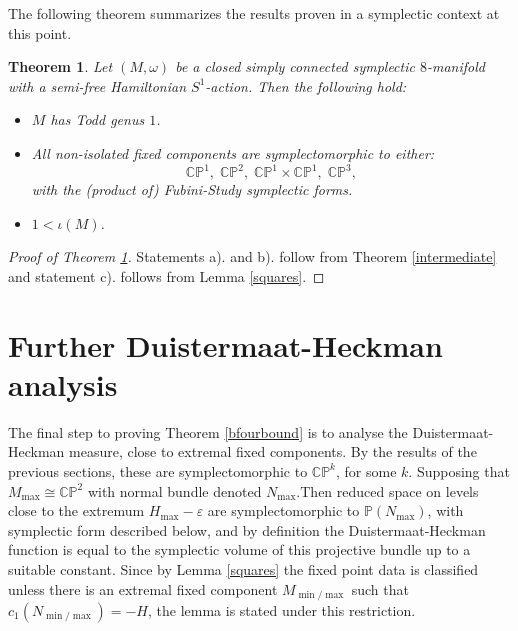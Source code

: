 \documentclass[12pt]{article}
\newtheorem{theorem}{Theorem}[section]
\begin{document}
The following theorem summarizes the results proven in a symplectic context at this point.

\begin{theorem} \label{symplecticmain}
Let $(M,\omega)$ be a closed  simply connected symplectic $8$-manifold with a semi-free Hamiltonian $S^1$-action. Then the following hold:
\begin{itemize}

\item[a).] $M$  has Todd genus $1$.
\item[b).] All non-isolated fixed  components are symplectomorphic to either: $$ \mathbb{CP}^1,\;\mathbb{CP}^2, \; \mathbb{CP}^1 \times \mathbb{CP}^1,\; \mathbb{CP}^3,$$ with the (product of) Fubini-Study symplectic forms.

\item[c).] $1 < \iota(M)$.
\end{itemize}
\end{theorem}
\begin{proof}[Proof of Theorem \ref{symplecticmain}]
Statements a). and  b). follow from Theorem \ref{intermediate} and statement c). follows from Lemma \ref{squares}. \end{proof}



\section{Further Duistermaat-Heckman analysis} \label{DHA}
The final step to proving Theorem \ref{bfourbound} is to analyse the Duistermaat-Heckman measure, close to extremal fixed components. By the results of the previous sections, these are symplectomorphic to $\mathbb{CP}^k$, for some $k$.  Supposing that $M_{\max} \cong \mathbb{CP}^2$ with normal bundle denoted $N_{\max}$.Then reduced space on levels close to the extremum $H_{\max} - \varepsilon$ are symplectomorphic to $\mathbb{P}(N_{\max})$, with symplectic form described below, and by definition the Duistermaat-Heckman function is equal to the symplectic volume of this projective bundle up to a suitable constant. Since by Lemma \ref{squares} the fixed point data is classified unless there is an extremal fixed  component $M_{\min/\max}$ such that $c_{1}(N_{\min/\max}) = -H$, the lemma is stated under this restriction.
\end{document}
